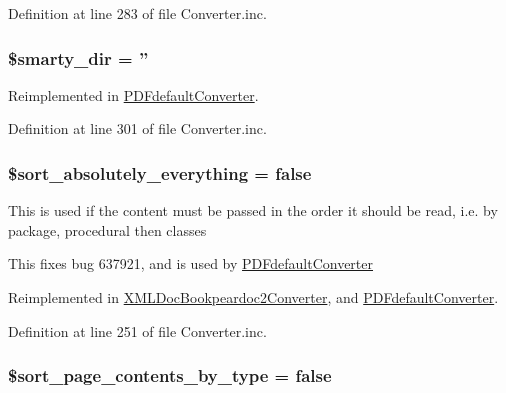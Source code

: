 \-Definition at line 283 of file \-Converter.\-inc.

\hypertarget{class_converter_afc2adf23943f2cf6a93997e5ab9bca62}{
\subsubsection[{\$smarty\-\_\-dir}]{\setlength{\rightskip}{0pt plus 5cm}\$smarty\-\_\-dir = ''}}\label{class_converter_afc2adf23943f2cf6a93997e5ab9bca62}


\-Reimplemented in \hyperlink{class_p_d_fdefault_converter_afc2adf23943f2cf6a93997e5ab9bca62}{\-P\-D\-Fdefault\-Converter}.



\-Definition at line 301 of file \-Converter.\-inc.

\hypertarget{class_converter_a40eea215f3b8eaec5c134f45f62aa100}{
\subsubsection[{\$sort\-\_\-absolutely\-\_\-everything}]{\setlength{\rightskip}{0pt plus 5cm}\$sort\-\_\-absolutely\-\_\-everything = false}}\label{class_converter_a40eea215f3b8eaec5c134f45f62aa100}
\-This is used if the content must be passed in the order it should be read, i.\-e. by package, procedural then classes

\-This fixes bug 637921, and is used by \hyperlink{class_p_d_fdefault_converter}{\-P\-D\-Fdefault\-Converter} 

\-Reimplemented in \hyperlink{class_x_m_l_doc_bookpeardoc2_converter_a40eea215f3b8eaec5c134f45f62aa100}{\-X\-M\-L\-Doc\-Bookpeardoc2\-Converter}, and \hyperlink{class_p_d_fdefault_converter_a40eea215f3b8eaec5c134f45f62aa100}{\-P\-D\-Fdefault\-Converter}.



\-Definition at line 251 of file \-Converter.\-inc.

\hypertarget{class_converter_ab5dae87e1968b35e37687a763216a835}{
\subsubsection[{\$sort\-\_\-page\-\_\-contents\-\_\-by\-\_\-type}]{\setlength{\rightskip}{0pt plus 5cm}\$sort\-\_\-page\-\_\-contents\-\_\-by\-\_\-type = false}}\label{class_converter_ab5dae87e1968b35e37687a763216a835}


